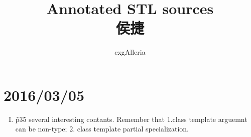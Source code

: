 \documentclass{ctexart}
\begin{document}
\title{%
	Annotated STL sources\\
		侯捷
}
\author{%
	cxgAlleria
}
\maketitle

\tableofcontents
\section[0305]{2016/03/05}
	\begin{enumerate}[I.]
		\item \~ p35 several interesting contants. Remember that 1.class template arguemnt can be non-type; 2. class template partial specialization.
	\end{enumerate}
\end{document}

